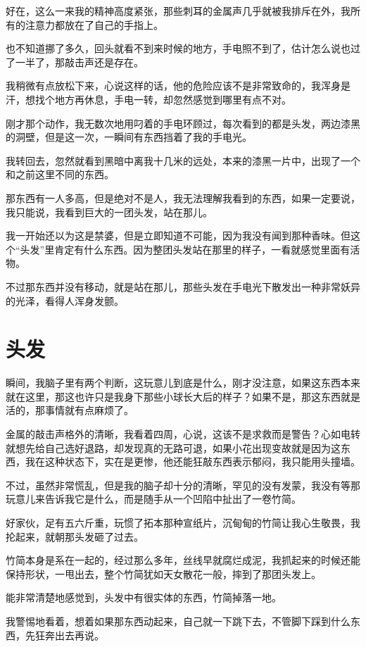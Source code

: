好在，这么一来我的精神高度紧张，那些刺耳的金属声几乎就被我排斥在外，我所有的注意力都放在了自己的手指上。

也不知道挪了多久，回头就看不到来时候的地方，手电照不到了，估计怎么说也过了一半了，那敲击声还是存在。

我稍微有点放松下来，心说这样的话，他的危险应该不是非常致命的，我浑身是汗，想找个地方再休息，手电一转，却忽然感觉到哪里有点不对。

刚才那个动作，我无数次地用叼着的手电环顾过，每次看到的都是头发，两边漆黑的洞壁，但是这一次，一瞬间有东西挡着了我的手电光。

我转回去，忽然就看到黑暗中离我十几米的远处，本来的漆黑一片中，出现了一个和之前这里不同的东西。

那东西有一人多高，但是绝对不是人，我无法理解我看到的东西，如果一定要说，我只能说，我看到巨大的一团头发，站在那儿。

我一开始还以为这是禁婆，但是立即知道不可能，因为我没有闻到那种香味。但这个“头发”里肯定有什么东西。因为整团头发站在那里的样子，一看就感觉里面有活物。

不过那东西并没有移动，就是站在那儿，那些头发在手电光下散发出一种非常妖异的光泽，看得人浑身发颤。

\chapter{头发}

瞬间，我脑子里有两个判断，这玩意儿到底是什么，刚才没注意，如果这东西本来就在这里，那这也许只是我身下那些小球长大后的样子？如果不是，那这东西就是活的，那事情就有点麻烦了。

金属的敲击声格外的清晰，我看着四周，心说，这该不是求救而是警告？心如电转就想先给自己选好退路，却发现真的无路可退，如果小花出现变故就是因为这东西，我在这种状态下，实在是更惨，他还能狂敲东西表示郁闷，我只能用头撞墙。

不过，虽然非常慌乱，但是我的脑子却十分的清晰，罕见的没有发蒙，我没有等那玩意儿来告诉我它是什么，而是随手从一个凹陷中扯出了一卷竹简。

好家伙，足有五六斤重，玩惯了拓本那种宣纸片，沉甸甸的竹简让我心生敬畏，我抡起来，就朝那头发砸了过去。

竹简本身是系在一起的，经过那么多年，丝线早就腐烂成泥，我抓起来的时候还能保持形状，一甩出去，整个竹简犹如天女散花一般，摔到了那团头发上。

能非常清楚地感觉到，头发中有很实体的东西，竹简掉落一地。

我警惕地看着，想着如果那东西动起来，自己就一下跳下去，不管脚下踩到什么东西，先狂奔出去再说。


